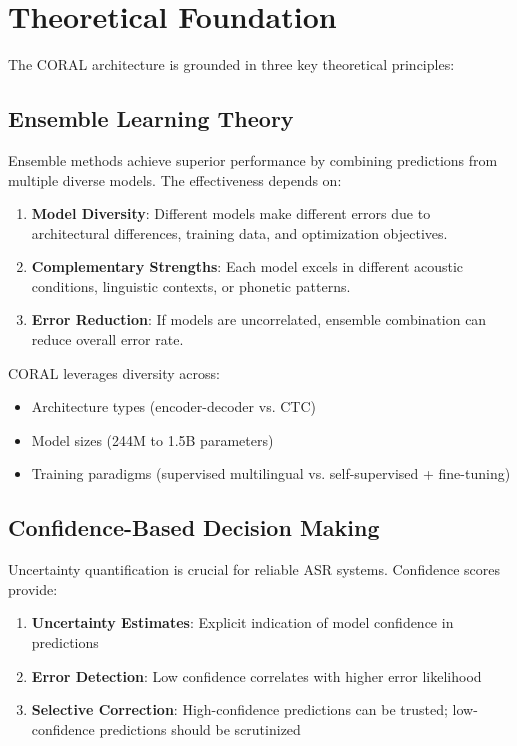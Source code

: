 \section{Theoretical Foundation}

The CORAL architecture is grounded in three key theoretical principles:

\subsection{Ensemble Learning Theory}

Ensemble methods achieve superior performance by combining predictions from multiple diverse models. The effectiveness depends on:

\begin{enumerate}
    \item \textbf{Model Diversity}: Different models make different errors due to architectural differences, training data, and optimization objectives.
    
    \item \textbf{Complementary Strengths}: Each model excels in different acoustic conditions, linguistic contexts, or phonetic patterns.
    
    \item \textbf{Error Reduction}: If models are uncorrelated, ensemble combination can reduce overall error rate.
\end{enumerate}

CORAL leverages diversity across:
\begin{itemize}
    \item Architecture types (encoder-decoder vs. CTC)
    \item Model sizes (244M to 1.5B parameters)
    \item Training paradigms (supervised multilingual vs. self-supervised + fine-tuning)
\end{itemize}

\subsection{Confidence-Based Decision Making}

Uncertainty quantification is crucial for reliable ASR systems. Confidence scores provide:

\begin{enumerate}
    \item \textbf{Uncertainty Estimates}: Explicit indication of model confidence in predictions
    \item \textbf{Error Detection}: Low confidence correlates with higher error likelihood
    \item \textbf{Selective Correction}: High-confidence predictions can be trusted; low-confidence predictions should be scrutinized
\end{enumerate}

